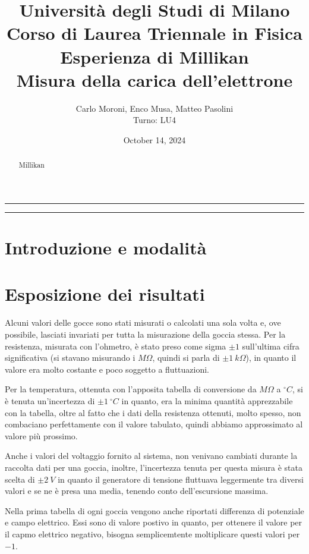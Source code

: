\documentclass{article}
\title{{\large Università degli Studi di Milano}\\{\large Corso di Laurea Triennale in Fisica}\\{\LARGE Esperienza di Millikan}\\{\normalsize Misura della carica dell'elettrone}}
\author{Carlo Moroni, Enco Musa, Matteo Pasolini\\{Turno: LU4}}
\date{October 14, 2024}
\begin{document}
	
\maketitle
\hrule
\begin{abstract}
	\begin{center}
		{\Large Millikan}
	\end{center}
\end{abstract}
\hrule

\section{Introduzione e modalità}

\section{Esposizione dei risultati}

Alcuni valori delle gocce sono stati misurati o calcolati una sola volta e, ove possibile, lasciati invariati per tutta la misurazione della goccia stessa. Per la resistenza, misurata con l'ohmetro, è stato preso come sigma $\pm1$ sull'ultima cifra significativa (si stavano misurando i $M\Omega$, quindi si parla di $\pm1\ k\Omega$), in quanto il valore era molto costante e poco soggetto a fluttuazioni.

Per la temperatura, ottenuta con l'apposita tabella di conversione da $M\Omega$ a $^\circ C$, si è tenuta un'incertezza di $\pm1\ ^\circ C$ in quanto, era la minima quantità apprezzabile con la tabella, oltre al fatto che i dati della resistenza ottenuti, molto spesso, non combaciano perfettamente con il valore tabulato, quindi abbiamo approssimato al valore più prossimo.

Anche i valori del voltaggio fornito al sistema, non venivano cambiati durante la raccolta dati per una goccia, inoltre, l'incertezza tenuta per questa misura è stata scelta di $\pm2\ V$ in quanto il generatore di tensione fluttuava leggermente tra diversi valori e se ne è presa una media, tenendo conto dell'escursione massima.

Nella prima tabella di ogni goccia vengono anche riportati differenza di potenziale e campo elettrico. Essi sono di valore postivo in quanto, per ottenere il valore per il capmo elettrico negativo, bisogna semplicemtente moltiplicare questi valori per $-1$.
\end{document}
